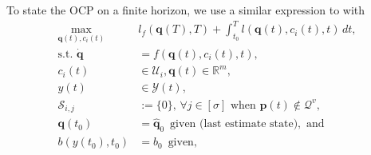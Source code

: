 
To state the OCP on a finite horizon, we use a similar expression to  with
\begin{subequations}\label{eq:ocp-output-mpc}\begin{align}
  \max_{\mathbf{q}(t),c_i(t)}&{l_f(\mathbf{q}(T),T)+\int_{t_0}^T{l(\mathbf{q}(t),c_i(t),t)\,dt}},\\
  \text{s.t. }\dot{\mathbf{q}}&=f(\mathbf{q}(t),c_i(t),t),\label{eq:dyn-evol}\\
  c_i(t)&\in\mathcal{U}_i,\mathbf{q}(t)\in\mathbb{R}^m,\label{eq:state-cont-const-mpc}\\
  y(t)&\in\mathcal{Y}(t),\label{eq:batt-const-mpc}\\
  \mathcal{S}_{i,j}&:=\{0\},\,\forall j \in [\sigma]\text{ when }\mathbf{p}(t)\notin\mathcal{Q}^v,\label{eq:polyg-const}\\
  \mathbf{q}(t_0)&=\hat{\mathbf{q}}_0\,\,\,\text{given (last estimate state)},\text{ and}\\
  b(y(t_0),t_0)&=b_0\,\,\,\text{given},
\end{align}\end{subequations}
